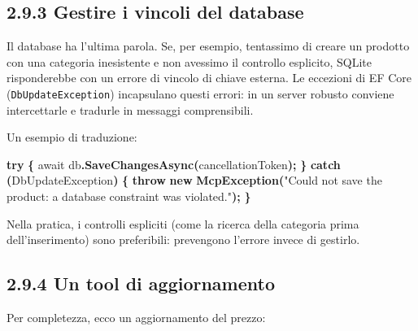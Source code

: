\documentclass[
  italian,
  10pt,
]{book}
\newenvironment{Shaded}{\begin{snugshade}}{\end{snugshade}}
\newcommand{\FunctionTok}[1]{\textcolor[rgb]{0.13,0.29,0.53}{\textbf{#1}}}
\newcommand{\KeywordTok}[1]{\textcolor[rgb]{0.13,0.29,0.53}{\textbf{#1}}}
\newcommand{\NormalTok}[1]{#1}
\newcommand{\OperatorTok}[1]{\textcolor[rgb]{0.81,0.36,0.00}{\textbf{#1}}}
\newcommand{\StringTok}[1]{\textcolor[rgb]{0.31,0.60,0.02}{#1}}
\begin{document}
\subsection{2.9.3 Gestire i vincoli del
database}\label{gestire-i-vincoli-del-database}

Il database ha l'ultima parola. Se, per esempio, tentassimo di creare un
prodotto con una categoria inesistente e non avessimo il controllo
esplicito, SQLite risponderebbe con un errore di vincolo di chiave
esterna. Le eccezioni di EF Core (\texttt{DbUpdateException})
incapsulano questi errori: in un server robusto conviene intercettarle e
tradurle in messaggi comprensibili.

Un esempio di traduzione:

\begin{Shaded}
\begin{Highlighting}[]
\KeywordTok{try}
\OperatorTok{\{}
\NormalTok{    await db}\OperatorTok{.}\FunctionTok{SaveChangesAsync}\OperatorTok{(}\NormalTok{cancellationToken}\OperatorTok{);}
\OperatorTok{\}}
\KeywordTok{catch} \OperatorTok{(}\NormalTok{DbUpdateException}\OperatorTok{)}
\OperatorTok{\{}
    \KeywordTok{throw} \KeywordTok{new} \FunctionTok{McpException}\OperatorTok{(}\StringTok{"Could not save the product: a database constraint was violated."}\OperatorTok{);}
\OperatorTok{\}}
\end{Highlighting}
\end{Shaded}

Nella pratica, i controlli espliciti (come la ricerca della categoria
prima dell'inserimento) sono preferibili: prevengono l'errore invece di
gestirlo.

\subsection{2.9.4 Un tool di
aggiornamento}\label{un-tool-di-aggiornamento}

Per completezza, ecco un aggiornamento del prezzo:
\end{document}
